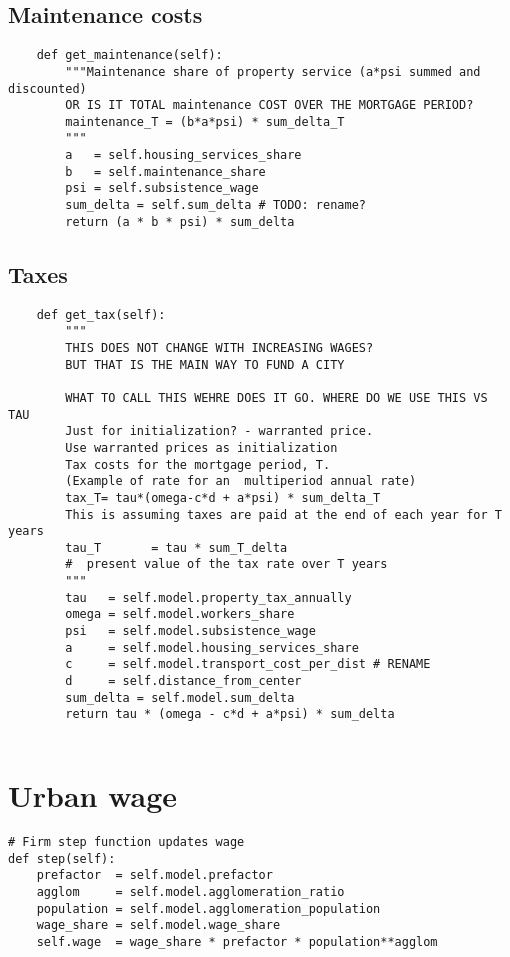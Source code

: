 \subsection{Maintenance costs}
\begin{lstlisting}
    def get_maintenance(self):
        """Maintenance share of property service (a*psi summed and discounted)
        OR IS IT TOTAL maintenance COST OVER THE MORTGAGE PERIOD?
        maintenance_T = (b*a*psi) * sum_delta_T
        """
        a   = self.housing_services_share
        b   = self.maintenance_share
        psi = self.subsistence_wage
        sum_delta = self.sum_delta # TODO: rename?
        return (a * b * psi) * sum_delta
\end{lstlisting}

\subsection{Taxes}
\begin{lstlisting}
    def get_tax(self):
        """ 
        THIS DOES NOT CHANGE WITH INCREASING WAGES?
        BUT THAT IS THE MAIN WAY TO FUND A CITY

        WHAT TO CALL THIS WEHRE DOES IT GO. WHERE DO WE USE THIS VS TAU
        Just for initialization? - warranted price. 
        Use warranted prices as initialization
        Tax costs for the mortgage period, T. 
        (Example of rate for an  multiperiod annual rate)
        tax_T= tau*(omega-c*d + a*psi) * sum_delta_T
        This is assuming taxes are paid at the end of each year for T years
        tau_T       = tau * sum_T_delta 
        #  present value of the tax rate over T years        
        """
        tau   = self.model.property_tax_annually
        omega = self.model.workers_share
        psi   = self.model.subsistence_wage
        a     = self.model.housing_services_share
        c     = self.model.transport_cost_per_dist # RENAME
        d     = self.distance_from_center
        sum_delta = self.model.sum_delta
        return tau * (omega - c*d + a*psi) * sum_delta
\end{lstlisting}

\begin{lstlisting}

\end{lstlisting}
\section{Urban wage}

\begin{lstlisting}
# Firm step function updates wage
def step(self):
    prefactor  = self.model.prefactor
    agglom     = self.model.agglomeration_ratio
    population = self.model.agglomeration_population
    wage_share = self.model.wage_share
    self.wage  = wage_share * prefactor * population**agglom
\end{lstlisting}


